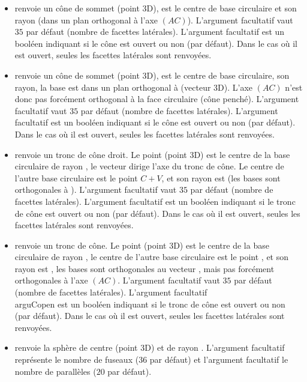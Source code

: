 \begin{itemize}
    \item {} renvoie un cône de sommet  (point 3D),  est le centre de base circulaire et  son rayon (dans un plan orthogonal à l'axe $(AC)$). L'argument facultatif  vaut $35$ par défaut (nombre de facettes latérales). L'argument facultatif  est un booléen indiquant si le cône est ouvert ou non (\false par défaut). Dans le cas où il est ouvert, seules les facettes latérales sont renvoyées.    
    
    \item {} renvoie un cône de sommet  (point 3D),  est le centre de base circulaire,  son rayon, la base est dans un plan orthogonal à  (vecteur 3D). L'axe $(AC)$ n'est donc pas forcément orthogonal à la face circulaire (cône penché). L'argument facultatif  vaut $35$ par défaut (nombre de facettes latérales). L'argument facultatif  est un booléen indiquant si le cône est ouvert ou non (\false par défaut). Dans le cas où il est ouvert, seules les facettes latérales sont renvoyées.        

    \item {} renvoie un tronc de cône droit. Le point  (point 3D) est le centre de la base circulaire de rayon , le vecteur  dirige l'axe du tronc de cône. Le centre de l'autre base circulaire est le point $C+V$, et son rayon est  (les bases sont orthogonales à ). L'argument facultatif  vaut $35$ par défaut (nombre de facettes latérales). L'argument facultatif  est un booléen indiquant si le tronc de cône est ouvert ou non (\false par défaut). Dans le cas où il est ouvert, seules les facettes latérales sont renvoyées.    
    
    \item {} renvoie un tronc de cône. Le point  (point 3D) est le centre de la base circulaire de rayon , le centre de l'autre base circulaire est le point , et son rayon est , les bases sont orthogonales au vecteur , mais pas forcément orthogonales à l'axe $(AC)$. L'argument facultatif  vaut $35$ par défaut (nombre de facettes latérales). L'argument facultatif \\argu{C}{open} est un booléen indiquant si le tronc de cône est ouvert ou non (\false par défaut). Dans le cas où il est ouvert, seules les facettes latérales sont renvoyées.

    \item {} renvoie la sphère de centre  (point 3D) et de rayon . L'argument facultatif  représente le nombre de fuseaux ($36$ par défaut) et l'argument facultatif  le nombre de parallèles ($20$ par défaut).
\end{itemize}

